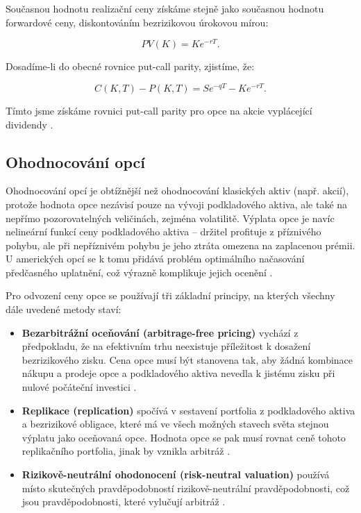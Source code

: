 \documentclass[male,czech,api_bc]{kitheses}
\begin{document}
  Současnou hodnotu realizační ceny získáme stejně jako současnou hodnotu forwardové ceny, diskontováním bezrizikovou úrokovou mírou:

  \begin{equation}
    PV(K) = Ke^{- rT}.
  \end{equation}

  Dosadíme-li do obecné rovnice put-call parity, zjistíme, že:

  \begin{equation}
    C(K, T) - P(K, T) = Se^{-qT} - Ke^{-rT}.
  \end{equation}

  Tímto jsme získáme rovnici put-call parity pro opce na akcie vyplácející dividendy \parencites[s.~279-281]{McDonald2013}.

  \subsection{Ohodnocování opcí}

  Ohodnocování opcí je obtížnější než ohodnocování klasických aktiv (např. akcií), protože hodnota opce nezávisí pouze na vývoji podkladového aktiva, ale také na nepřímo pozorovatelných veličinách, zejména volatilitě. Výplata opce je navíc nelineární funkcí ceny podkladového aktiva – držitel profituje z příznivého pohybu, ale při nepříznivém pohybu je jeho ztráta omezena na zaplacenou prémii. U amerických opcí se k tomu přidává problém optimálního načasování předčasného uplatnění, což výrazně komplikuje jejich ocenění \parencites[s.~7--12]{Hull2021}.

  Pro odvození ceny opce se používají tři základní principy, na kterých všechny dále uvedené metody staví:

  \begin{itemize}
    \item \textbf{Bezarbitrážní oceňování (arbitrage-free pricing)} vychází z předpokladu, že na efektivním trhu neexistuje příležitost k dosažení bezrizikového zisku. Cena opce musí být stanovena tak, aby žádná kombinace nákupu a prodeje opce a podkladového aktiva nevedla k jistému zisku při nulové počáteční investici \parencites[s.~14--17]{Hull2021}.
    \item \textbf{Replikace (replication)} spočívá v sestavení portfolia z podkladového aktiva a bezrizikové obligace, které má ve všech možných stavech světa stejnou výplatu jako oceňovaná opce. Hodnota opce se pak musí rovnat ceně tohoto replikačního portfolia, jinak by vznikla arbitráž \parencites[s.~278--281]{McDonald2013}.
    \item \textbf{Rizikově-neutrální ohodonocení (risk-neutral valuation)} používá místo skutečných pravděpodobností rizikově-neutrální pravděpodobnosti, což jsou pravděpodobnosti, které vylučují arbitráž \parencites[s.~359--362]{McDonald2013}[kapitola~15.10]{Wilmott2006}. \label{sec:risk_neutral}
  \end{itemize}
\end{document}
